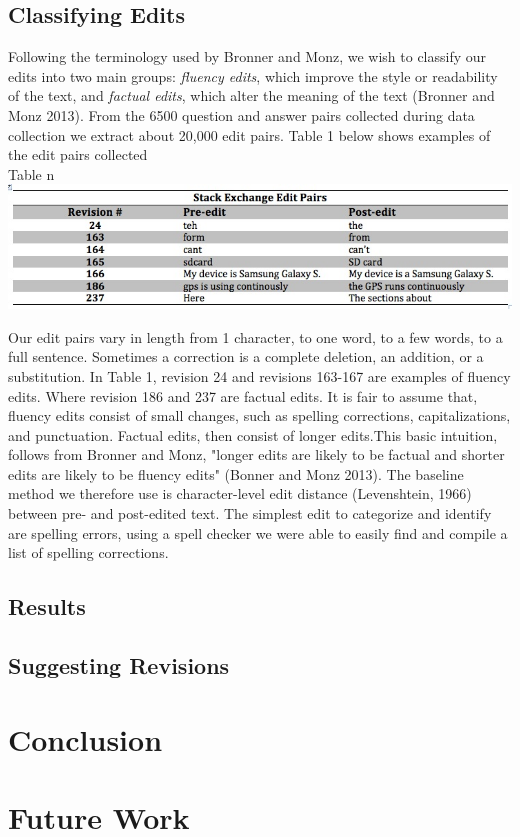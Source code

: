 \documentclass[11pt, oneside]{article}   	%
\begin{document}
\subsection{Classifying Edits} 
Following the terminology used by Bronner and Monz, we wish to classify our edits into two main groups:{ \itshape fluency edits}, which improve the style or readability of the text, and {\itshape factual edits}, which alter the meaning of the text (Bronner and Monz 2013).   From the 6500 question and answer pairs collected during data collection we extract about 20,000 edit pairs.  Table 1 below shows examples of the edit pairs collected\\
\centering
Table n
\includegraphics[width=\textwidth]{table1-editpairs}

\raggedright
Our edit pairs vary in length from 1 character, to one word, to a few words, to a full sentence. Sometimes a correction is a complete deletion, an addition, or a substitution. In Table 1, revision 24 and revisions 163-167 are examples of fluency edits. Where revision 186 and 237 are factual edits. It is fair to assume that, fluency edits consist of small changes, such as spelling corrections, capitalizations, and punctuation. Factual edits, then consist of longer edits.This basic intuition, follows from Bronner and Monz, "longer edits are likely
to be factual and shorter edits are likely to be fluency edits" (Bonner and Monz 2013). The baseline method we therefore use is character-level edit distance (Levenshtein, 1966) between pre- and post-edited text. The simplest edit to categorize and identify are spelling errors, using a spell checker we were able to easily find and compile a list of spelling corrections.

\subsection{Results}
\subsection{Suggesting Revisions}

\section{Conclusion}
\section{Future Work}
\end{document}
